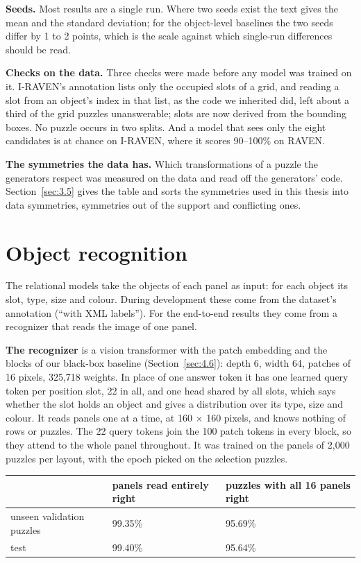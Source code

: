 \textbf{Seeds.} Most results are a single run. Where two seeds exist the text gives the mean and the standard deviation; for the object-level baselines the two seeds differ by 1 to 2 points, which is the scale against which single-run differences should be read.

\textbf{Checks on the data.} Three checks were made before any model was trained on it. I-RAVEN's annotation lists only the occupied slots of a grid, and reading a slot from an object's index in that list, as the code we inherited did, left about a third of the grid puzzles unanswerable; slots are now derived from the bounding boxes. No puzzle occurs in two splits. And a model that sees only the eight candidates is at chance on I-RAVEN, where it scores 90–100\% on RAVEN.

\textbf{The symmetries the data has.} Which transformations of a puzzle the generators respect was measured on the data and read off the generators' code. Section~\ref{sec:3.5} gives the table and sorts the symmetries used in this thesis into data symmetries, symmetries out of the support and conflicting ones.

\section{Object recognition}\label{sec:4.3}

The relational models take the objects of each panel as input: for each object its slot, type, size and colour. During development these come from the dataset's annotation (``with XML labels''). For the end-to-end results they come from a recognizer that reads the image of one panel.

\textbf{The recognizer} is a vision transformer with the patch embedding and the blocks of our black-box baseline (Section~\ref{sec:4.6}): depth 6, width 64, patches of 16 pixels, 325,718 weights. In place of one answer token it has one learned query token per position slot, 22 in all, and one head shared by all slots, which says whether the slot holds an object and gives a distribution over its type, size and colour. It reads panels one at a time, at 160 × 160 pixels, and knows nothing of rows or puzzles. The 22 query tokens join the 100 patch tokens in every block, so they attend to the whole panel throughout. It was trained on the panels of 2,000 puzzles per layout, with the epoch picked on the selection puzzles.

\begin{center}\small
\begin{tabularx}{\linewidth}{@{}YYY@{}}
\toprule
 & panels read entirely right & puzzles with all 16 panels right \\
\midrule
unseen validation puzzles & 99.35\% & 95.69\% \\
test & 99.40\% & 95.64\% \\
\bottomrule
\end{tabularx}
\end{center}

